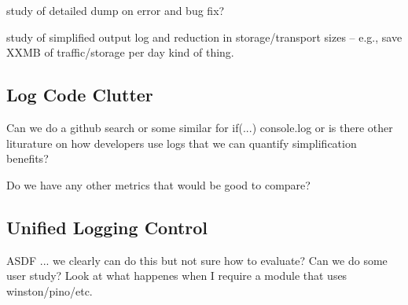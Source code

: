 study of detailed dump on error and bug fix?

study of simplified output log and reduction in storage/transport sizes -- 
e.g., save XXMB of traffic/storage per day kind of thing.

\subsection{Log Code Clutter}
Can we do a github search or some similar for if(...) console.log or 
is there other liturature on how developers use logs that we can 
quantify simplification benefits?

Do we have any other metrics that would be good to compare?

\subsection{Unified Logging Control}
ASDF ... we clearly can do this but not sure how to evaluate? 
Can we do some user study? Look at what happenes when I require a 
module that uses winston/pino/etc.


